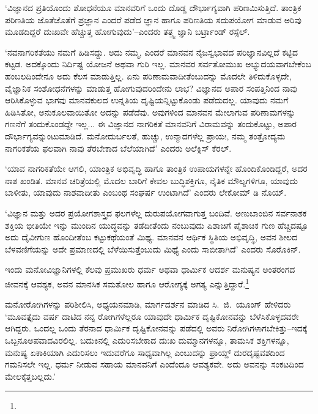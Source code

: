 ‘ವಿಜ್ಞಾನದ ಪ್ರತಿಯೊಂದು ಶೋಧನೆಯೂ ಮಾನವರಿಗೆ ಒಂದು ದೊಡ್ಡ ದೌರ್ಭಾಗ್ಯವಾಗಿ ಪರಿಣಮಿಸುತ್ತಿದೆ. ತಾಂತ್ರಿಕ ಪರಿಣತಿಯ ಜೊತೆಜೊತೆಗೆ ಪ್ರಜ್ಞಾನ ಎಂದರೆ ಪಡೆದ ಜ್ಞಾನ ಹಾಗೂ ಪರಿಣತಿಯ ಸದುಪಯೋಗ ಮಾಡುವ ಅರಿವು ಮೂಡದಿದ್ದರೆ ದುಃಖವೇ ಹೆಚ್ಚುತ್ತ ಹೋಗುವುದು’–ಎಂದರು ತತ್ತ್ವ ಜ್ಞಾನಿ ಬರ್ಟ್ರಾಂಡ್ ರಸ್ಸೆಲ್.

‘ನವನಾಗರಿಕತೆಯು ನಮಗೆ ಹಿಡಿಸದ್ದು. ಅದು ನಮ್ಮ, ಎಂದರೆ ಮಾನವನ ನೈಜಸ್ವಭಾವದ ಪರಿಜ್ಞಾನವಿಲ್ಲದೆ ಕಟ್ಟಿದ ಕಟ್ಟಡ. ಅದಕ್ಕೊಂದು ನಿರ್ದಿಷ್ಟ ಯೋಜನೆ ಅಥವಾ ಗುರಿ ಇಲ್ಲ. ಮಾನವರ ಸರ್ವತೋಮುಖ ಅಭ್ಯುದಯವಾಗಬೇಕೆಂಬ ಹಂಬಲದಿಂದೇನೂ ಅದು ಕೆಲಸ ಮಾಡುತ್ತಿಲ್ಲ. ಏನು ಪರಿಣಾಮವಾದೀತೆಂಬುದನ್ನು ಮೊದಲೇ ತಿಳಿದುಕೊಳ್ಳದೇ, ವೈಜ್ಞಾನಿಕ ಸಂಶೋಧನೆಗಳನ್ನು ಮಾಡುತ್ತ ಹೋಗುವುದರಿಂದೇನು ಲಾಭ? ವಿಜ್ಞಾನದ ಅಪಾರ ಸಂಪತ್ತಿನಿಂದ ನಾವು ಆರಿಸಿಕೊಳ್ಳುವ ಭಾಗವು ಮಾನವಕುಲದ ಉನ್ನತಿಯ ದೃಷ್ಟಿಯನ್ನಿಟ್ಟುಕೊಂಡು ಪಡೆದುದಲ್ಲ. ಯಾವುದು ನಮಗೆ ಹಿಡಿಸಿತೋ, ಅನುಕೂಲವಾಯಿತೋ ಅದನ್ನು ಪಡೆದೆವು. ಅವುಗಳಿಂದ ಮಾನವನ ಮೇಲಾಗುವ ಪರಿಣಾಮಗಳನ್ನು ಗಣನೆಗೆ ತಂದುಕೊಂಡದ್ದೇ ಇಲ್ಲ... ಈ ವಿಜ್ಞಾನದ ನಾಗರಿಕತೆ ಮಾನವನಿಗೆ ವಿರಾಮವನ್ನು ತಂದುಕೊಟ್ಟು, ಅಪಾರ ದೌರ್ಭಾಗ್ಯವನ್ನುಂಟುಮಾಡಿದೆ. ಮನೋದುರ್ಬಲತೆ, ಹುಚ್ಚು, ಉನ್ಮಾದಗಳೆಲ್ಲ ಪ್ರಾಯಃ, ನಮ್ಮ ತಂತ್ರೋದ್ಯಮ ನಾಗರಿಕತೆಯ ಫಲವಾಗಿ ನಾವು ತೆರಬೇಕಾದ ಬೆಲೆಯಾಗಿದೆ’ ಎಂದರು ಅಲೆಕ್ಸಿಸ್ ಕೆರಲ್.

‘ಯಾವ ನಾಗರಿಕತೆಯೇ ಆಗಲಿ, ಯಾಂತ್ರಿಕ ಅಭಿವೃದ್ಧಿ ಹಾಗೂ ತಾಂತ್ರಿಕ ಉಪಾಯಗಳನ್ನೇ ಹೊಂದಿಕೊಂಡಿದ್ದರೆ, ಅದರ ನಾಶ ಖಂಡಿತ. ಮಾನವ ಚರಿತ್ರೆಯಲ್ಲಿ ಮೊದಲ ಬಾರಿಗೆ ಕೇವಲ ಬುದ್ಧಿಶಕ್ತಿಗೂ, ನೈತಿಕ ಮೌಲ್ಯಗಳಿಗೂ, ಯಾವುದು ಬಾಳೀತು, ಯಾವುದು ನಾಶವಾದೀತು ಎಂಬಂಥ ಸಂಘರ್ಷ ಉಂಟಾಗಿದೆ’ ಎಂದರು ಲೇಕೋಮ್ ಡಿ ನೊಯ್.

‘ವಿಜ್ಞಾನ ಮತ್ತು ಅದರ ಪ್ರಯೋಗಶಾಸ್ತ್ರದ ಫಲಗಳೆಲ್ಲ ದುರುಪಯೋಗವಾಗುತ್ತ ಬಂದಿವೆ. ಅಣುಬಾಂಬಿನ ಸರ್ವನಾಶಕ ಶಕ್ತಿಯ ಭೀತಿಯೇ ಇನ್ನು ಮುಂದಿನ ಯುದ್ಧವನ್ನು ತಡೆದೀತೆಂದು ನಂಬುವುದು ಪಿಶಾಚಿಗೆ ಪೈಶಾಚಿಕ ಗುಣ ಹೆಚ್ಚಿದಷ್ಟೂ ಅದು ದೈವೀಗುಣ ಹೊಂದೀತೆಂಬ ಕಟ್ಟುಕಥೆಯಂತೆ ಮಿಥ್ಯ. ಮಾನವನ ಆರ್ಥಿಕ ಸ್ಥಿತಿಯ ಅಭಿವೃದ್ಧಿ, ಅವನ ಶೀಲದ ಬೆಳವಣಿಗೆಯನ್ನು ಅದೇ ಪ್ರಮಾಣದಲ್ಲಿ ಬೆಳೆಯಿಸುತ್ತೆಂಬುದು ಮಿಥ್ಯೆ ಎಂದು ಸಾಬೀತಾಗಿದೆ’ ಎಂದರು ಸೊರೊಕಿನ್.

ಇಂದು ಮನೋವಿಜ್ಞಾನಿಗಳಲ್ಲಿ ಕೆಲವು ಪ್ರಮುಖರು ಧರ್ಮ ಅಥವಾ ಧಾರ್ಮಿಕ ಆದರ್ಶ ಮನುಷ್ಯನ ಅಂತರಂಗದ ಜೀವನಕ್ಕೆ ಆವಶ್ಯಕ, ಅವನ ಮಾನಸಿಕ ಸಮತೋಲ ಹಾಗೂ ಆರೋಗ್ಯಕ್ಕೆ ಅಗತ್ಯ ಎನ್ನುತ್ತಿದ್ದಾರೆ.\footnote{\hfill{}}

ಮನೋರೋಗಿಗಳನ್ನು ಪರಿಶೀಲಿಸಿ, ಅಧ್ಯಯನಮಾಡಿ, ಮಾರ್ಗದರ್ಶನ ಮಾಡಿದ ಸಿ.\ ಜಿ.\ ಯೂಂಗ್ ಹೇಳಿದರು ‘ಮೂವತ್ತೈದು ವರ್ಷ ದಾಟಿದ ನನ್ನ ರೋಗಿಗಳೆಲ್ಲರೂ ಯಾವುದೇ ಧಾರ್ಮಿಕ ದೃಷ್ಟಿಕೋನವನ್ನು ಬೆಳೆಸಿಕೊಳ್ಳದವರೇ ಆಗಿದ್ದರು. ಒಂದಲ್ಲ ಒಂದು ತೆರನಾದ ಧಾರ್ಮಿಕ ದೃಷ್ಟಿಕೋನವನ್ನು ಪಡೆದಲ್ಲಿ ಅವರು ನಿರೋಗಿಗಳಾಗಬೇಕಿತ್ತು–ಇದಕ್ಕೆ ಒಬ್ಬನೂ\break ಅಪವಾದವಿರಲಿಲ್ಲ. ಬದುಕಿನಲ್ಲಿ ಎದುರಿಸಬೇಕಾದ ದುಃಖ ದುಮ್ಮಾನಗಳನ್ನೂ, ತಾಮಸಿಕ ಶಕ್ತಿಗಳನ್ನೂ, ಮನುಷ್ಯ ಏಕಾಕಿಯಾಗಿ ಎದುರಿಸಲು ಇದುವರೆಗೂ ಸಾಧ್ಯವಾಗಿಲ್ಲ ಎಂಬುದನ್ನು ಫ್ರಾಯ್ಡ್ ದುರದೃಷ್ಟವಶದಿಂದ ಗಮನಿಸಲೇ ಇಲ್ಲ. ಧರ್ಮ ನೀಡುವ ಸಹಾಯ ಮಾನವನಿಗೆ ಎಂದೆಂದೂ ಆವಶ್ಯಕವೇ. ಅದು ಅವನನ್ನು ಸಂಕಟದಿಂದ ಮೇಲಕ್ಕೆತ್ತಬಲ್ಲದು.’


